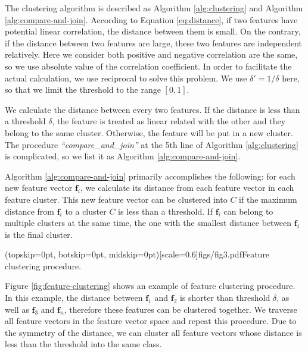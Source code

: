 \documentclass{ieeeaccess}
\theoremstyle{definition}
\begin{document}
The clustering algorithm is described as Algorithm \ref{alg:clustering} and Algorithm \ref{alg:compare-and-join}.
According to Equation \ref{eq:distance}, if two features have potential linear correlation, the distance between them is small. On the contrary, if the distance between two features are large, these two features are independent relatively. Here we consider both positive and negative correlation are the same, so we use absolute value of the correlation coefficient. 
In order to facilitate the actual calculation, we use reciprocal to solve this problem. We use $\delta' = 1/\delta$ here, so that we limit the threshold to the range $[0,1]$.

We calculate the distance between every two features. If the distance is less than a threshold $\delta$, the feature is treated as linear related with the other and they belong to the same cluster. Otherwise, the feature will be put in a new cluster. The procedure \emph{``compare\_and\_join''} at the 5th line of Algorithm \ref{alg:clustering} is complicated, so we list it as Algorithm \ref{alg:compare-and-join}.

Algorithm \ref{alg:compare-and-join} primarily accomplishes the following: for each new feature vector $\bm{f}_i$, we calculate its distance from each feature vector in each feature cluster. This new feature vector can be clustered into $C$ if the maximum distance from $\bm{f}_i$ to a cluster $C$ is less than a threshold. 
If $\bm{f}_i$ can belong to multiple clusters at the same time, the one with the smallest distance between $\bm{f}_i$ is the final cluster.

\Figure[!htpb](topskip=0pt, botskip=0pt, midskip=0pt)[scale=0.6]{figs/fig3.pdf}{Feature clustering procedure. \label{fig:feature-clustering}}

Figure \ref{fig:feature-clustering} shows an example of feature clustering procedure. In this example, the distance between $\bm{f}_1$ and $\bm{f}_2$ is shorter than threshold $\delta$, as well as $\bm{f}_3$ and $\bm{f}_n$, therefore these features can be clustered together. We traverse all feature vectors in the feature vector space and repeat this procedure. Due to the symmetry of the distance, we can cluster all feature vectors whose distance is less than the threshold into the same class. 
\end{document}
